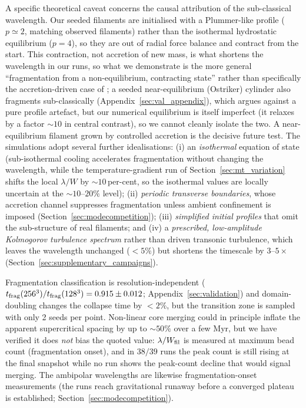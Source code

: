 \documentclass[usenatbib,twoside,twocolumn]{mnras}
\begin{document}
A specific theoretical caveat concerns the causal attribution of the sub-classical wavelength. Our seeded filaments are initialised with a Plummer-like profile ($p\simeq2$, matching observed filaments) rather than the isothermal hydrostatic equilibrium ($p=4$), so they are out of radial force balance and contract from the start. This contraction, not accretion of new mass, is what shortens the wavelength in our runs, so what we demonstrate is the more general ``fragmentation from a non-equilibrium, contracting state'' rather than specifically the accretion-driven case of \citet{Clarke2016,Clarke2017}; a seeded near-equilibrium (Ostriker) cylinder also fragments sub-classically (Appendix~\ref{sec:val_appendix}), which argues against a pure profile artefact, but our numerical equilibrium is itself imperfect (it relaxes by a factor $\sim10$ in central contrast), so we cannot cleanly isolate the two. A near-equilibrium filament grown by controlled accretion is the decisive future test. The simulations adopt several further idealisations: (i) an \emph{isothermal} equation of state (sub-isothermal cooling accelerates fragmentation without changing the wavelength, while the temperature-gradient run of Section~\ref{sec:mt_variation} shifts the local $\lambda/W$ by $\sim10$\,per-cent, so the isothermal values are locally uncertain at the $\sim10$--$20\%$ level); (ii) \emph{periodic transverse boundaries}, whose accretion channel suppresses fragmentation unless ambient confinement is imposed (Section~\ref{sec:modecompetition}); (iii) \emph{simplified initial profiles} that omit the sub-structure of real filaments; and (iv) a \emph{prescribed, low-amplitude Kolmogorov turbulence spectrum} rather than driven transonic turbulence, which leaves the wavelength unchanged ($<5\%$) but shortens the timescale by $3$--$5\times$ (Section~\ref{sec:supplementary_campaigns}).

Fragmentation classification is resolution-independent ($t_{\rm frag}(256^3)/t_{\rm frag}(128^3)=0.915\pm0.012$; Appendix~\ref{sec:validation}) and domain-doubling changes the collapse time by $<2\%$, but the transition zone is sampled with only 2 seeds per point. Non-linear core merging could in principle inflate the apparent supercritical spacing by up to $\sim50\%$ over a few Myr, but we have verified it does \emph{not} bias the quoted value: $\lambda/W_{\rm fil}$ is measured at maximum bead count (fragmentation onset), and in $38/39$ runs the peak count is still rising at the final snapshot while no run shows the peak-count decline that would signal merging. The ambipolar wavelengths are likewise fragmentation-onset measurements (the runs reach gravitational runaway before a converged plateau is established; Section~\ref{sec:modecompetition}).
\end{document}
